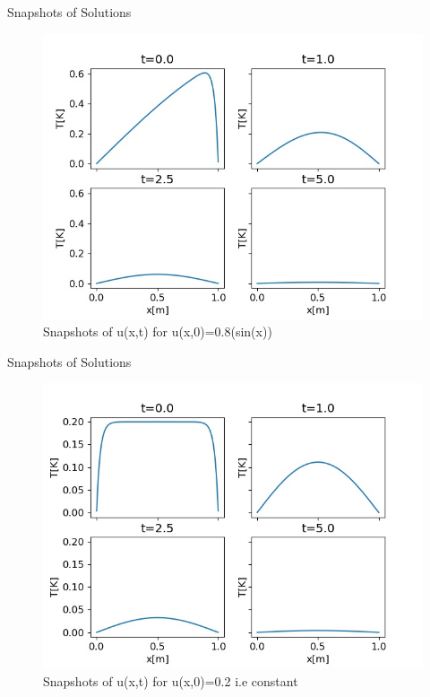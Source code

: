 \documentclass[10pt,compress]{beamer}
\begin{document}
\begin{frame}{Snapshots of Solutions}
\begin{figure}
\begin{center}
	\includegraphics[scale=0.5]{../plots/snap_0_0500_2000.jpg}
	\caption{Snapshots of u(x,t) for u(x,0)=0.8(sin(x))}
	\label{fig:sin-snap}
\end{center}
\end{figure}
\end{frame}

\begin{frame}{Snapshots of Solutions}
\begin{figure}
\begin{center}
	\includegraphics[scale=0.5]{../plots/snap_1_0500_2000.jpg}
	\caption{Snapshots of u(x,t) for u(x,0)=0.2 i.e constant}
	\label{fig:const-snap}
\end{center}
\end{figure}
\end{frame}
\end{document}
